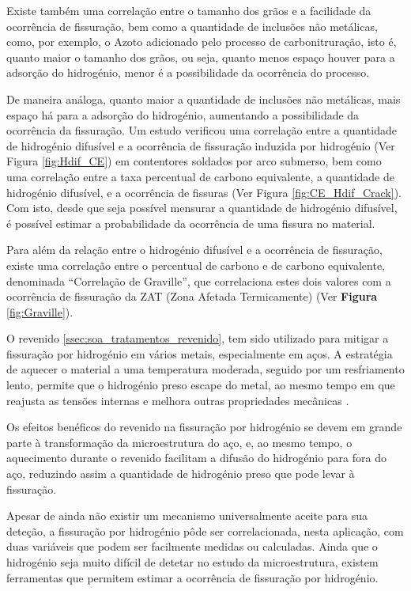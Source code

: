 \newpage
\par
Existe também uma correlação entre o tamanho dos grãos e a facilidade da ocorrência de fissuração\cite{Seo2008}, bem como a quantidade de inclusões não metálicas, como, por exemplo, o Azoto adicionado pelo processo de carbonitruração, isto é, quanto maior o tamanho dos grãos, ou seja, quanto menos espaço houver para a adsorção do hidrogénio, menor é a possibilidade da ocorrência do processo.
\par
De maneira análoga, quanto maior a quantidade de inclusões não metálicas, mais espaço há para a adsorção do hidrogénio, aumentando a possibilidade da ocorrência da fissuração. Um estudo verificou uma correlação entre a quantidade de hidrogénio difusível e a ocorrência de fissuração induzida por hidrogénio\cite{Santos2021} (Ver Figura \ref{fig:Hdif_CE}) em contentores soldados por arco submerso, bem como uma correlação entre a taxa percentual de carbono equivalente, a quantidade de hidrogénio difusível, e a ocorrência de fissuras (Ver Figura \ref{fig:CE_Hdif_Crack}). Com isto, desde que seja possível mensurar a quantidade de hidrogénio difusível, é possível estimar a probabilidade da ocorrência de uma fissura no material.
\par
Para além da relação entre o hidrogénio difusível e a ocorrência de fissuração, existe uma correlação entre o percentual de carbono e de carbono equivalente, denominada “Correlação de Graville”, que correlaciona estes dois valores com a ocorrência de fissuração da ZAT (Zona Afetada Termicamente) (Ver \textbf{Figura} \ref{fig:Graville})\cite{Olson2007}.
\par
O revenido \ref{ssec:soa_tratamentos_revenido}, tem sido utilizado para mitigar a fissuração por hidrogénio em vários metais, especialmente em aços. A estratégia de aquecer o material a uma temperatura moderada, seguido por um resfriamento lento, permite que o hidrogénio preso escape do metal, ao mesmo tempo em que reajusta as tensões internas e melhora outras propriedades mecânicas \cite{Krauss2015}.
\par
Os efeitos benéficos do revenido na fissuração por hidrogénio se devem em grande parte à transformação da microestrutura do aço, e, ao mesmo tempo, o aquecimento durante o revenido facilitam a difusão do hidrogénio para fora do aço, reduzindo assim a quantidade de hidrogénio preso que pode levar à fissuração.
\par
Apesar de ainda não existir um mecanismo universalmente aceite para sua deteção, a fissuração por hidrogénio pôde ser correlacionada, nesta aplicação, com duas variáveis que podem ser facilmente medidas ou calculadas. Ainda que o hidrogénio seja muito difícil de detetar no estudo da microestrutura, existem ferramentas que permitem estimar a ocorrência de fissuração por hidrogénio.

